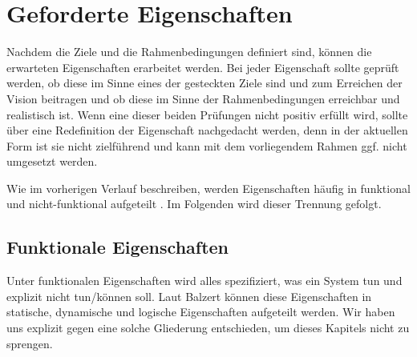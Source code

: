 \section{Geforderte Eigenschaften}
Nachdem die Ziele und die Rahmenbedingungen definiert sind, können die erwarteten Eigenschaften erarbeitet werden. Bei jeder Eigenschaft sollte geprüft werden, ob diese im Sinne eines der gesteckten Ziele sind und zum Erreichen der Vision beitragen und ob diese im Sinne der Rahmenbedingungen erreichbar und realistisch ist. Wenn eine dieser beiden Prüfungen nicht positiv erfüllt wird, sollte über eine Redefinition der Eigenschaft nachgedacht werden, denn in der aktuellen Form ist sie nicht zielführend und kann mit dem vorliegendem Rahmen ggf. nicht umgesetzt werden.

\vspace{0.25cm}

Wie im vorherigen Verlauf beschreiben, werden Eigenschaften häufig in funktional und nicht-funktional aufgeteilt \cite{Balzert.2009}. Im Folgenden wird dieser Trennung gefolgt.

\newpage

\subsection{Funktionale Eigenschaften}\label{sec:funktionale_eigenschaften}
\label{sec:funcReq}
Unter funktionalen Eigenschaften wird alles spezifiziert, was ein System tun und explizit nicht tun/können soll. Laut Balzert können diese Eigenschaften in statische, dynamische und logische Eigenschaften aufgeteilt werden\cite{Balzert.2009}. Wir haben uns explizit gegen eine solche Gliederung entschieden, um dieses Kapitels nicht zu sprengen.

\vspace{0.25cm}

